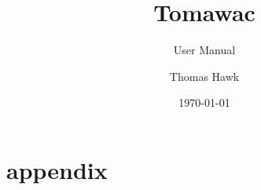 \documentclass[Tomawac]{../../data/TelemacDoc} %
\begin{document}
\let\cleardoublepage\clearpage

\title{Tomawac}
\subtitle{User Manual}
\version{\telmaversion}
\author{Thomas Hawk}
\date{\today}
\maketitle
\clearpage



\newpage

\thispagestyle{empty}

\TelemacCopyright{}



\pagestyle{empty} %

\tableofcontents%


\pagestyle{fancy} %










\newpage
\appendix
\chapter{appendix}









\end{document}
